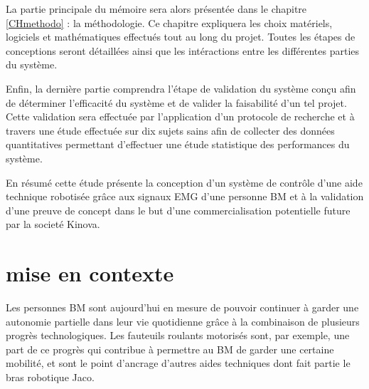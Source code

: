 \documentclass[letterpaper, twoside, 12pt, memoire, creativecommons, hyperref]{thETS}
\begin{document}
\begin{introduction}
La partie principale du mémoire sera alors présentée dans le chapitre \ref{CHmethodo} : la méthodologie. Ce chapitre expliquera les choix matériels, logiciels et mathématiques effectués tout au long du projet. Toutes les étapes de conceptions seront détaillées ainsi que les intéractions entre les différentes parties du système. 

Enfin, la dernière partie comprendra l'étape de validation du système conçu afin de déterminer l'efficacité du système et de valider la faisabilité d'un tel projet. Cette validation sera effectuée par l'application d'un protocole de recherche et à travers une étude effectuée sur dix sujets sains afin de collecter des données quantitatives permettant d'effectuer une étude statistique des performances du système.

En résumé cette étude présente la conception d'un système de contrôle d'une aide technique robotisée grâce aux signaux EMG d'une personne BM et à la validation d'une preuve de concept dans le but d'une commercialisation potentielle future par la societé Kinova.

%



\end{introduction}

%
%

\chapter{mise en contexte}
\label{CHmiseencontexte}

Les personnes BM sont aujourd'hui en mesure de pouvoir continuer à garder une autonomie partielle dans leur vie quotidienne grâce à la combinaison de plusieurs progrès technologiques. Les fauteuils roulants motorisés sont, par exemple, une part de ce progrès qui contribue à permettre au BM de garder une certaine mobilité, et sont le point d'ancrage d'autres aides techniques dont fait partie le bras robotique Jaco.
\end{document}
